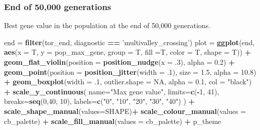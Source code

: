\documentclass[]{book}
\newenvironment{Shaded}{\begin{snugshade}}{\end{snugshade}}
\newcommand{\DataTypeTok}[1]{\textcolor[rgb]{0.13,0.29,0.53}{#1}}
\newcommand{\DecValTok}[1]{\textcolor[rgb]{0.00,0.00,0.81}{#1}}
\newcommand{\FloatTok}[1]{\textcolor[rgb]{0.00,0.00,0.81}{#1}}
\newcommand{\KeywordTok}[1]{\textcolor[rgb]{0.13,0.29,0.53}{\textbf{#1}}}
\newcommand{\NormalTok}[1]{#1}
\newcommand{\OperatorTok}[1]{\textcolor[rgb]{0.81,0.36,0.00}{\textbf{#1}}}
\newcommand{\OtherTok}[1]{\textcolor[rgb]{0.56,0.35,0.01}{#1}}
\newcommand{\StringTok}[1]{\textcolor[rgb]{0.31,0.60,0.02}{#1}}
\begin{document}
\hypertarget{end-of-50000-generations-19}{%
\subsubsection{End of 50,000 generations}\label{end-of-50000-generations-19}}

Best gene value in the population at the end of 50,000 generations.

\begin{Shaded}
\begin{Highlighting}[]
\NormalTok{end =}\StringTok{ }\KeywordTok{filter}\NormalTok{(tor_end, diagnostic }\OperatorTok{==}\StringTok{ 'multivalley_crossing'}\NormalTok{)}
\NormalTok{plot =}\StringTok{ }\KeywordTok{ggplot}\NormalTok{(end, }\KeywordTok{aes}\NormalTok{(}\DataTypeTok{x =}\NormalTok{ T, }\DataTypeTok{y =}\NormalTok{ pop_max_gene, }\DataTypeTok{group =}\NormalTok{ T, }\DataTypeTok{fill =}\NormalTok{T, }\DataTypeTok{color =}\NormalTok{ T, }\DataTypeTok{shape =}\NormalTok{ T)) }\OperatorTok{+}
\StringTok{  }\KeywordTok{geom_flat_violin}\NormalTok{(}\DataTypeTok{position =} \KeywordTok{position_nudge}\NormalTok{(}\DataTypeTok{x =} \FloatTok{.3}\NormalTok{), }\DataTypeTok{alpha =} \FloatTok{0.2}\NormalTok{) }\OperatorTok{+}
\StringTok{  }\KeywordTok{geom_point}\NormalTok{(}\DataTypeTok{position =} \KeywordTok{position_jitter}\NormalTok{(}\DataTypeTok{width =} \FloatTok{.1}\NormalTok{), }\DataTypeTok{size =} \FloatTok{1.5}\NormalTok{, }\DataTypeTok{alpha =} \FloatTok{10.8}\NormalTok{) }\OperatorTok{+}
\StringTok{  }\KeywordTok{geom_boxplot}\NormalTok{(}\DataTypeTok{width =} \FloatTok{.1}\NormalTok{, }\DataTypeTok{outlier.shape =} \OtherTok{NA}\NormalTok{, }\DataTypeTok{alpha =} \FloatTok{0.1}\NormalTok{, }\DataTypeTok{col =} \StringTok{"black"}\NormalTok{) }\OperatorTok{+}
\StringTok{  }\KeywordTok{scale_y_continuous}\NormalTok{(}
    \DataTypeTok{name=}\StringTok{"Max gene value"}\NormalTok{,}
    \DataTypeTok{limits=}\KeywordTok{c}\NormalTok{(}\OperatorTok{-}\DecValTok{1}\NormalTok{, }\DecValTok{41}\NormalTok{),}
    \DataTypeTok{breaks=}\KeywordTok{seq}\NormalTok{(}\DecValTok{0}\NormalTok{,}\DecValTok{40}\NormalTok{, }\DecValTok{10}\NormalTok{),}
    \DataTypeTok{labels=}\KeywordTok{c}\NormalTok{(}\StringTok{"0"}\NormalTok{, }\StringTok{"10"}\NormalTok{, }\StringTok{"20"}\NormalTok{, }\StringTok{"30"}\NormalTok{, }\StringTok{"40"}\NormalTok{)}
\NormalTok{  ) }\OperatorTok{+}
\StringTok{  }\KeywordTok{scale_shape_manual}\NormalTok{(}\DataTypeTok{values=}\NormalTok{SHAPE)}\OperatorTok{+}
\StringTok{  }\KeywordTok{scale_colour_manual}\NormalTok{(}\DataTypeTok{values =}\NormalTok{ cb_palette) }\OperatorTok{+}
\StringTok{  }\KeywordTok{scale_fill_manual}\NormalTok{(}\DataTypeTok{values =}\NormalTok{ cb_palette) }\OperatorTok{+}
\StringTok{  }\NormalTok{p_theme}


\end{Highlighting}
\end{Shaded}
\end{document}
